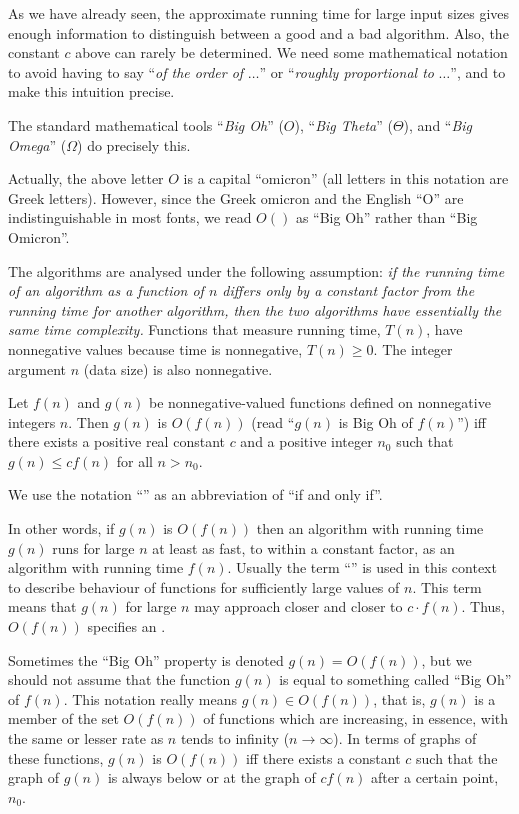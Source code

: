 As we have already seen, the approximate running time for large input
sizes gives enough information to distinguish between a good and a bad
algorithm. Also, the constant $c$ above can rarely be determined. We
need some mathematical notation to avoid having to say ``\emph{of the
order of} $\ldots$''  or ``\emph{roughly proportional to} $\ldots$'',
and to make this intuition precise.

The standard mathematical tools ``\emph{Big Oh}'' ($O$), ``\emph{Big
Theta}'' ($\Theta$), and ``\emph{Big Omega}'' ($\Omega$) do 
precisely this.

\begin{note}
Actually, the above letter $O$ is a capital ``omicron''  (all
letters in this notation are Greek letters). However, since the Greek
omicron and the English ``O'' are indistinguishable in most fonts, we
read $O()$ as ``Big Oh'' rather than ``Big Omicron''. 
\end{note}

The algorithms are analysed under the following assumption: \emph{if
the running time of an algorithm as a function of $n$ differs only by a
constant factor from the  running time for another algorithm, then the
two algorithms have essentially the same time complexity.} Functions that
measure running time, $T(n)$, have nonnegative values because time is
nonnegative, $T(n) \ge 0$. The integer argument $n$ (data size) is also
nonnegative.

\begin{Definition} [Big Oh]
\label{def:oh}
Let $f(n)$ and $g(n)$ be nonnegative-valued functions defined on
nonnegative integers $n$. Then $g(n)$ is $O(f(n))$ (read ``\(g(n)\) is
Big Oh of \(f(n)\)'') iff there exists 
a positive real constant $c$ and
a positive integer $n_{0}$ such that $g(n) \le c f(n)$ for all $n>n_{0}$.
\end{Definition}
\begin{note} 
We use the notation ``'' as an abbreviation of ``if and only if''.
\end{note}
In other words, if $g(n)$ is $O(f(n))$ then an algorithm with running time 
$g(n)$ runs for large $n$ at least as fast, to within a
constant factor, as an algorithm with running time  $f(n)$. Usually
the term ``'' is used in this context to describe 
behaviour of functions for sufficiently large values of $n$. This term 
means that \(g(n)\) for large \(n\) may approach closer and closer to 
\(c\cdot f(n)\). Thus, \(O(f(n))\) specifies
an .
\begin{note} 
Sometimes the ``Big Oh'' property is denoted $g(n)=O(f(n))$, but
we should not assume that the function $g(n)$ is equal to something 
called ``Big Oh'' of $f(n)$. This notation really means $g(n) \in O(f(n))$, 
that is, \(g(n)\) is a member of the set $O(f(n))$ 
of functions which are increasing, in essence, with the same 
or lesser rate as  \(n\) tends to infinity ($n \rightarrow \infty$). 
In terms of graphs of these functions, $g(n)$ is $O(f(n))$ iff
there exists a constant $c$ such that the graph of $g(n)$ is always
below or at the graph of $cf(n)$ after a certain point, $n_{0}$. 
\end{note}

